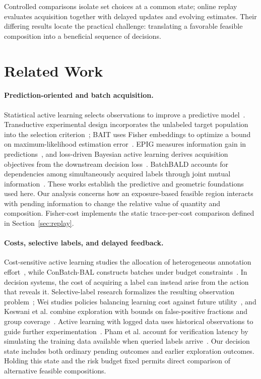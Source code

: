 \documentclass[runningheads]{llncs}
\begin{document}
Controlled comparisons isolate set choices at a common state; online replay evaluates acquisition together with delayed updates and evolving estimates. Their differing results locate the practical challenge: translating a favorable feasible composition into a beneficial sequence of decisions.
\section{Related Work}
\label{sec:related}

\paragraph{Prediction-oriented and batch acquisition.}
Statistical active learning selects observations to improve a predictive model~\cite{cohn1996active}. Transductive experimental design incorporates the unlabeled target population into the selection criterion~\cite{yu2006transductive}; BAIT uses Fisher embeddings to optimize a bound on maximum-likelihood estimation error~\cite{ash2021fishing}. EPIG measures information gain in predictions~\cite{bickfordsmith2023prediction}, and loss-driven Bayesian active learning derives acquisition objectives from the downstream decision loss~\cite{huang2026loss}. BatchBALD accounts for dependencies among simultaneously acquired labels through joint mutual information~\cite{kirsch2019batchbald}. These works establish the predictive and geometric foundations used here. Our analysis concerns how an exposure-based feasible region interacts with pending information to change the relative value of quantity and composition. Fisher-cost implements the static trace-per-cost comparison defined in Section~\ref{sec:replay}.

\paragraph{Costs, selective labels, and delayed feedback.}
Cost-sensitive active learning studies the allocation of heterogeneous annotation effort~\cite{tomanek2010cost}, while ConBatch-BAL constructs batches under budget constraints~\cite{morato2025conbatch}. In decision systems, the cost of acquiring a label can instead arise from the action that reveals it. Selective-label research formalizes the resulting observation problem~\cite{lakkaraju2017selective}; Wei studies policies balancing learning cost against future utility~\cite{wei2021selective}, and Keswani et al. combine exploration with bounds on false-positive fractions and group coverage~\cite{keswani2024partial}. Active learning with logged data uses historical observations to guide further experimentation~\cite{yan2018logged}. Pham et al. account for verification latency by simulating the training data available when queried labels arrive~\cite{pham2022latency}. Our decision state includes both ordinary pending outcomes and earlier exploration outcomes. Holding this state and the risk budget fixed permits direct comparison of alternative feasible compositions.
\end{document}
